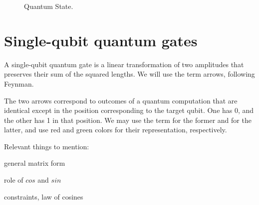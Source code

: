 \documentclass[11pt, letterpaper]{article}
\def\onecol{true}
\newcommand{\myvspace}[1]{\vspace{0.0in}}
\begin{document}
{  \begin{figure}[hbt]
	\begin{centering}
		\ifthenelse{\equal{\onecol}{true}}{ \def\xyz{.3}}{ \def\xyz{.36}}
		\def\zyx{.005}
		{\setlength\fboxsep{0pt}}\hspace{\zyx\columnwidth}
		
		\caption{Quantum State.} 
		\label{fig:state}
	\end{centering}
\end{figure}
\myvspace{-.1in}


\newpage

\section{Single-qubit quantum gates}
\label{sec:gates}
A single-qubit quantum gate is a linear transformation of two amplitudes that preserves their sum of the squared lengths. We will use the term arrows, following Feynman.

The  two arrows correspond to outcomes of a quantum computation that are identical except in the position corresponding to the target qubit. One has 0, and the other has 1 in that position. We may use the term  for the former and  for the latter, and use red and green colors for their representation, respectively.

Relevant things to mention:
\begin{compactitem}
\item  general matrix form 
\item  role of $cos$ and $sin$
\item constraints, law of cosines
\end{compactitem}

}
\end{document}
